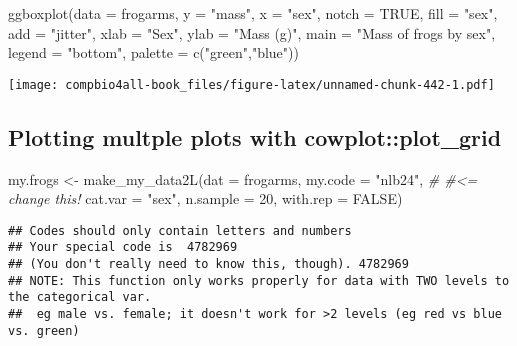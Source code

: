 \documentclass[
]{book}
\newenvironment{Shaded}{\begin{snugshade}}{\end{snugshade}}
\newcommand{\AttributeTok}[1]{\textcolor[rgb]{0.77,0.63,0.00}{#1}}
\newcommand{\CommentTok}[1]{\textcolor[rgb]{0.56,0.35,0.01}{\textit{#1}}}
\newcommand{\ConstantTok}[1]{\textcolor[rgb]{0.00,0.00,0.00}{#1}}
\newcommand{\DecValTok}[1]{\textcolor[rgb]{0.00,0.00,0.81}{#1}}
\newcommand{\FunctionTok}[1]{\textcolor[rgb]{0.00,0.00,0.00}{#1}}
\newcommand{\NormalTok}[1]{#1}
\newcommand{\OtherTok}[1]{\textcolor[rgb]{0.56,0.35,0.01}{#1}}
\newcommand{\StringTok}[1]{\textcolor[rgb]{0.31,0.60,0.02}{#1}}
\begin{document}
\begin{Shaded}
\begin{Highlighting}[]
\FunctionTok{ggboxplot}\NormalTok{(}\AttributeTok{data =}\NormalTok{ frogarms,}
          \AttributeTok{y =} \StringTok{"mass"}\NormalTok{,}
          \AttributeTok{x =} \StringTok{"sex"}\NormalTok{,}
          \AttributeTok{notch  =} \ConstantTok{TRUE}\NormalTok{,}
          \AttributeTok{fill =} \StringTok{"sex"}\NormalTok{,}
          \AttributeTok{add =} \StringTok{"jitter"}\NormalTok{,}
          \AttributeTok{xlab =} \StringTok{"Sex"}\NormalTok{,}
          \AttributeTok{ylab =} \StringTok{"Mass (g)"}\NormalTok{,}
          \AttributeTok{main =} \StringTok{"Mass of frogs by sex"}\NormalTok{,}
          \AttributeTok{legend =} \StringTok{"bottom"}\NormalTok{,}
          \AttributeTok{palette =} \FunctionTok{c}\NormalTok{(}\StringTok{"green"}\NormalTok{,}\StringTok{"blue"}\NormalTok{))}
\end{Highlighting}
\end{Shaded}

\texttt{[image: compbio4all-book\_files/figure-latex/unnamed-chunk-442-1.pdf]}

\hypertarget{plotting-multple-plots-with-cowplotplot_grid}{%
\subsection{Plotting multple plots with cowplot::plot\_grid}\label{plotting-multple-plots-with-cowplotplot_grid}}

\begin{Shaded}
\begin{Highlighting}[]
\NormalTok{my.frogs }\OtherTok{\textless{}{-}} \FunctionTok{make\_my\_data2L}\NormalTok{(}\AttributeTok{dat =}\NormalTok{ frogarms, }
                           \AttributeTok{my.code =} \StringTok{"nlb24"}\NormalTok{,  }\CommentTok{\# \#\textless{}=  change this!}
                           \AttributeTok{cat.var =} \StringTok{"sex"}\NormalTok{,}
                           \AttributeTok{n.sample =} \DecValTok{20}\NormalTok{, }
                           \AttributeTok{with.rep =} \ConstantTok{FALSE}\NormalTok{)}
\end{Highlighting}
\end{Shaded}

\begin{verbatim}
## Codes should only contain letters and numbers
## Your special code is  4782969
## (You don't really need to know this, though). 4782969
## NOTE: This function only works properly for data with TWO levels to the categorical var.
##  eg male vs. female; it doesn't work for >2 levels (eg red vs blue vs. green)
\end{verbatim}
\end{document}
